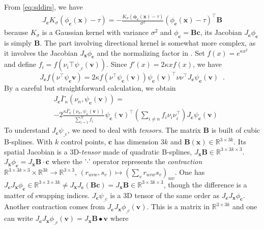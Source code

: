 \documentclass[twocolumn]{svjour3}
\begin{document}
From \cref{eq:sddirs}, we have
 \begin{align}
   J_{\bm c}K_\sigma(\phi_{\bm c}(\bm x)-\tau) = -\frac{K_\sigma(\bm\phi_{\bm c}(\bm x) - \tau)}{\sigma^2}
   \left(\phi_{\bm c}(\bm x)-\tau\right)^\top \bm B
 \end{align}
 because $K_\sigma$ is a Gaussian kernel with variance $\sigma^2$ and
 $\phi_{\bm c} = {\bm B}\bm c$, its Jacobian $J_{\bm c}\phi_{\bm c}$ is simply $\bm
 B$. The part involving directional kernel is somewhat more complex, as it involves the
 Jacobian $J_{\bm x}\phi_{\bm c}$ and the normalizing factor in .
 Set $f(x) = e^{\kappa x^2}$ and define $f_i = f(\nu_i\top \psi_{\bm_c}(\bm v))$. Since
 $f'(x) = 2\kappa x f(x)$, we have
\begin{equation}
  J_{\bm c} f(\nu^\top\psi_{\bm c}\bm v) = 2\kappa
  f(\nu^\top\psi_{\bm c}(\bm v))\psi_{\bm c}(\bm v)^\top \nu\nu^\top J_{\bm c}\psi_{\bm c}(\bm v) \;\; .
\end{equation}
By a careful but straightforward calculation, we obtain
\begin{align}
    ~&J_{\bm c}\bar{\Gamma}_{\kappa}(\nu_n,\psi_{\bm c}(\bm v))=\\
    &-2\frac{\kappa\bar{\Gamma}_{\kappa}(\nu_n,\psi_{\bm c}(\bm v))}{\sum_{i=1}^N f_i}
    \psi_{\bm c}(\bm v)^\top\!\!\left(\sum_{i\not=n}\! f_i\nu_i\nu_i^\top\!\right)\!J_{\bm c}\psi_{\bm c}(\bm v)
\end{align}
To understand $J_{\bm c}\psi_{\bm_c}$, we need to deal with \emph{tensors}.  The matrix
$\bm B$ is built of cubic B-splines. With $k$ control points, $\bm c$ has dimension $3k$
and $\bm B(\bm x)\in \mathbb R^{3\times 3k}$. Its spatial Jacobian is a 3D-\emph{tensor}
made of quadratic B-splines, $J_{\bm x}\bm B\in \mathbb R^{3\times 3k\times 3}$.
$J_{\bm x}\phi_{\bm c} = J_{\bm x}\bm B\cdot \bm c$ where the '$\cdot$' operator
represents the \emph{contraction}
$\mathbb R^{3\times 3k\times 3}\times \mathbb R^{3k}\to \mathbb R^{3\times 3}$,
$(r_{uvw},s_{v})\mapsto \left(\sum_v r_{uvw} s_v\right)_{uw}$. One has
$ J_{\bm c}J_{\bm x}\phi_{\bm c} \in \mathbb R^{3\times 3\times 3k}\not= J_{\bm x}J_{\bm
  c}(\bm B\bm c) = J_{\bm x}\bm B\in \mathbb R^{3\times 3k\times 3}$, though the
difference is a matter of swapping indices.  $J_{\bm c}\psi_{\bm_c}$ is a 3D tensor of the
same order as $J_{\bm c}J_{\bm x}\phi_{\bm c}$. Another contraction comes from
$J_{\bm c}J_{\bm x}\phi_{\bm_c}(\bm v)$. This is a matrix in $\mathbb R^{3\times 3k}$ and
one can write $J_{\bm c}J_{\bm x}\phi_{\bm_c}(\bm v) = J_{\bm x}\bm B\bullet \bm v$ where
\end{document}
